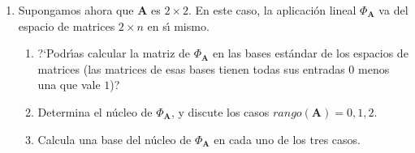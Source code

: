 \begin{ejer}
\begin{enumerate}
 \item Supongamos ahora que $\mathbf{A}$ es $2\times 2$. En este caso, la
aplicaci\'on lineal $\Phi_{\mathbf{A}}$ va del espacio
de matrices $2\times n$ en s\'{\i} mismo.
 
 \begin{enumerate}
 \item \label{phi-matriz}?`Podr\'{\i}as calcular la matriz de
$\Phi_{\mathbf{A}}$ en las bases
est\'andar de los espacios de matrices (las matrices de esas bases tienen todas
sus entradas $0$ menos una que vale $1$)?

\item Determina el n\'ucleo de $\Phi_{\mathbf{A}}$, y discute los casos
$rango(\mathbf{A})=0,1,2.$ 

 \item Calcula una base del n\'ucleo de $\Phi_{\mathbf{A}}$ en cada uno de los
tres casos.

\end{enumerate}
 \end{enumerate}
\end{ejer}

\begin{comment}
En la hoja de {\sage} 
\href{http://sage.mat.uam.es:8888/home/pub/25/}{\tt 26-CAVAN-phisubA.sws}
puedes ver la soluci\'on de un caso particular del apartado \ref{phi-matriz}.
C\'alculos parecidos,  usando {\sage},  te pueden ayudar bastante a resolver el
ejercicio completo.
\end{comment}
